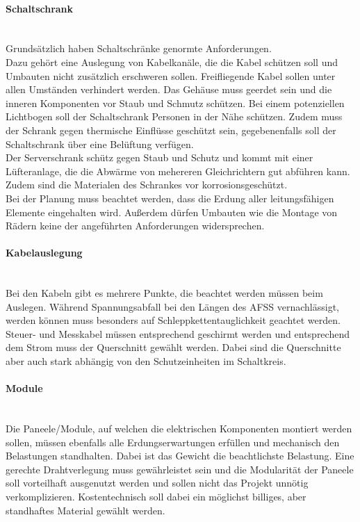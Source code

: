     \paragraph{Schaltschrank}\mbox{}\\
    Grundsätzlich haben Schaltschränke genormte Anforderungen.\\
    Dazu gehört eine Auslegung von Kabelkanäle, die die Kabel schützen soll und Umbauten nicht zusätzlich erschweren sollen. Freifliegende Kabel sollen unter allen Umständen verhindert werden. Das Gehäuse muss geerdet sein und die inneren Komponenten vor Staub und Schmutz schützen. Bei einem potenziellen Lichtbogen soll der Schaltschrank Personen in der Nähe schützen. Zudem muss der Schrank gegen thermische Einflüsse geschützt sein, gegebenenfalls soll der Schaltschrank über eine Belüftung verfügen.\\
    Der Serverschrank schütz gegen Staub und Schutz und kommt mit einer Lüfteranlage, die die Abwärme von mehereren Gleichrichtern gut abführen kann. Zudem sind die Materialen des Schrankes vor korrosionsgeschützt.\\
    Bei der Planung muss beachtet werden, dass die Erdung aller leitungsfähigen Elemente eingehalten wird. Außerdem dürfen Umbauten wie die Montage von Rädern keine der angeführten Anforderungen widersprechen.

    \paragraph{Kabelauslegung}\mbox{}\\
    Bei den Kabeln gibt es mehrere Punkte, die beachtet werden müssen beim Auslegen. Während Spannungsabfall bei den Längen des AFSS vernachlässigt, werden können muss besonders auf Schleppkettentauglichkeit geachtet werden. Steuer- und Messkabel müssen entsprechend geschirmt werden und entsprechend dem Strom muss der Querschnitt gewählt werden. Dabei sind die Querschnitte aber auch stark abhängig von den Schutzeinheiten im Schaltkreis.

    \paragraph{Module}\mbox{}\\
    Die Paneele/Module, auf welchen die elektrischen Komponenten montiert werden sollen, müssen ebenfalls alle Erdungserwartungen erfüllen und mechanisch den Belastungen standhalten. Dabei ist das Gewicht die beachtlichste Belastung. Eine gerechte Drahtverlegung muss gewährleistet sein und die Modularität der Paneele soll vorteilhaft ausgenutzt werden und sollen nicht das Projekt unnötig verkomplizieren. Kostentechnisch soll dabei ein möglichst billiges, aber standhaftes Material gewählt werden.

